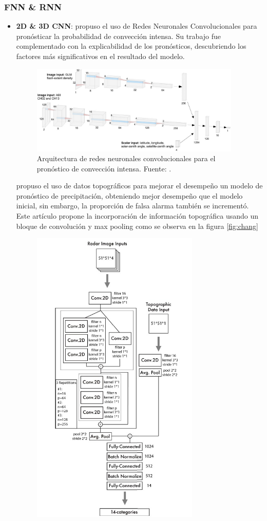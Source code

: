 \subsubsection{FNN \& RNN}
\begin{itemize}
  \item \textbf{2D \& 3D CNN}: \cite{Cintineo2020} propuso el uso de Redes 
  Neuronales Convolucionales para pronósticar la probabilidad de convección 
  intensa. Su trabajo fue complementado con la explicabilidad de los 
  pronósticos, descubriendo los factores más significativos en el resultado del 
  modelo.
  \begin{figure}[H]
    \centering
    \includegraphics[width=10cm]{E_IMAGENES/3_EstadoArte/cintineo_1}
    \caption[Modelo CNN]{
      Arquitectura de redes neuronales convolucionales para el pronóstico de 
      convección intensa. Fuente: \cite{Cintineo2020}.
    }
    \label{fig:cintineo}
  \end{figure}
  \cite{Chang2018} propuso el uso de datos topográficos para mejorar el 
  desempeño un modelo de pronóstico de precipitación, obteniendo mejor 
  desempeño que el modelo inicial, sin embargo, la proporción de falsa alarma 
  también se incrementó. Este artículo propone la incorporación de información 
  topográfica usando un bloque de convolución y max pooling como se observa en 
  la figura \ref{fig:chang}
  \begin{figure}[H]
    \centering
    \includegraphics[width=8cm]{E_IMAGENES/3_EstadoArte/chang_1}

\end{figure}
\end{itemize}
